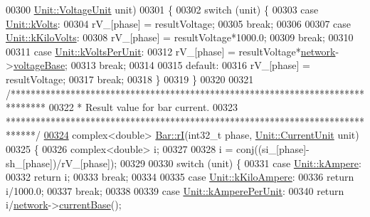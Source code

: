 \begin{DoxyCode}
00300                 \hyperlink{class_unit_a55b07dfa9457e1eca2c7194fe0cfc3c1}{Unit::VoltageUnit} unit)
00301 \{
00302   \textcolor{keywordflow}{switch} (unit) \{
00303   \textcolor{keywordflow}{case} \hyperlink{class_unit_a55b07dfa9457e1eca2c7194fe0cfc3c1aa54b2473993a702a3923525765bd6e4c}{Unit::kVolts}:
00304     rV\_[phase] = resultVoltage;
00305     \textcolor{keywordflow}{break};
00306 
00307   \textcolor{keywordflow}{case} \hyperlink{class_unit_a55b07dfa9457e1eca2c7194fe0cfc3c1a35a201a658c2cd89766787c657e9a54d}{Unit::kKiloVolts}:
00308     rV\_[phase] = resultVoltage*1000.0;
00309     \textcolor{keywordflow}{break};
00310 
00311   \textcolor{keywordflow}{case} \hyperlink{class_unit_a55b07dfa9457e1eca2c7194fe0cfc3c1ab44b1310b59fdcdc9df5bbea91da4206}{Unit::kVoltsPerUnit}:
00312     rV\_[phase] = resultVoltage*\hyperlink{class_bar_a80025f13884750add58cc61b318357ff}{network}->\hyperlink{group___graphics_ga7c1e79d9ac69df9a69f24eaf092fd5e5}{voltageBase};
00313     \textcolor{keywordflow}{break};
00314 
00315   \textcolor{keywordflow}{default}:
00316     rV\_[phase] = resultVoltage;
00317     \textcolor{keywordflow}{break};
00318   \}
00319 \}
00320 
00321 \textcolor{comment}{/*******************************************************************************}
00322 \textcolor{comment}{ * Result value for bar current.}
00323 \textcolor{comment}{ ******************************************************************************/}
\hypertarget{bar_8cpp_source_l00324}{}\hyperlink{group___models_ga8a009531f01430aa68eba739bb0dc2ea}{00324} complex<double> \hyperlink{group___models_ga8a009531f01430aa68eba739bb0dc2ea}{Bar::rI}(int32\_t phase, \hyperlink{class_unit_a0794cf6c9682f48296dd4a5315389787}{Unit::CurrentUnit} unit)
00325 \{
00326   complex<double> i;
00327 
00328   i = conj((si\_[phase]-sh\_[phase])/rV\_[phase]);
00329 
00330   \textcolor{keywordflow}{switch} (unit) \{
00331   \textcolor{keywordflow}{case} \hyperlink{class_unit_a0794cf6c9682f48296dd4a5315389787a368a3c470f0b590a6100dda717a7dd4f}{Unit::kAmpere}:
00332     \textcolor{keywordflow}{return} i;
00333     \textcolor{keywordflow}{break};
00334 
00335   \textcolor{keywordflow}{case} \hyperlink{class_unit_a0794cf6c9682f48296dd4a5315389787aa27cb5edd73099f24f2285e02396ae14}{Unit::kKiloAmpere}:
00336     \textcolor{keywordflow}{return} i/1000.0;
00337     \textcolor{keywordflow}{break};
00338 
00339   \textcolor{keywordflow}{case} \hyperlink{class_unit_a0794cf6c9682f48296dd4a5315389787aeed3b50e464d581cb630181a3b6a0709}{Unit::kAmperePerUnit}:
00340     \textcolor{keywordflow}{return} i/\hyperlink{class_bar_a80025f13884750add58cc61b318357ff}{network}->\hyperlink{group___graphics_ga433bc5c32cf2ce5329bb40b21952d885}{currentBase}();

\end{DoxyCode}
